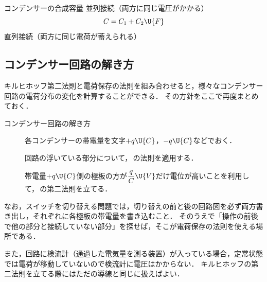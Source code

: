 \bsNeed{44mm}
\begin{matome}{コンデンサーの合成容量}
 \hspace{3mm} 並列接続（両方に同じ電圧がかかる）
 \[C=C_1+C_2\U{F}\]
 \hspace{3mm} 直列接続（両方に同じ電荷が蓄えられる）
\end{matome}

\subsection{コンデンサー回路の解き方}

キルヒホッフ第二法則と電荷保存の法則を組み合わせると，様々なコンデンサー回路の電荷分布の変化を計算することができる．
その方針をここで再度まとめておく．

\bsNeed{40mm}
\begin{matome}{コンデンサー回路の解き方}
\begin{description}
\item[] 各コンデンサーの帯電量を文字$+q\U{C}$，$-q\U{C}$などでおく．
\item[] 回路の浮いている部分について，\,の法則を適用する．
\item[] 帯電量$+q\U{C}$側の極板の方が$\dfrac{q}{C}\U{V}$だけ電位が高いことを利用して，\,の第二法則を立てる．
\end{description}
\end{matome}

なお，スイッチを切り替える問題では，{\gtfamily 切り替えの前と後の回路図を必ず両方書き出し，それぞれに各極板の帯電量を書き込む}こと．
そのうえで「操作の前後で他の部分と接続していない部分」を探せば，そこが電荷保存の法則を使える場所である．

また，回路に{\gtfamily 検流計}（通過した電気量を測る装置）が入っている場合，定常状態では電荷が移動していないので検流計に電圧はかからない．
キルヒホッフの第二法則を立てる際には{\gtfamily ただの導線と同じ}に扱えばよい．


